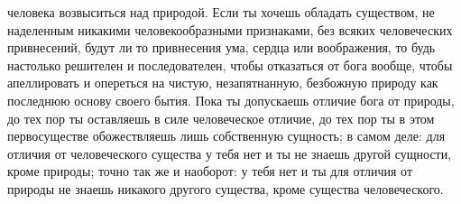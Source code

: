 \documentclass[12pt,oneside]{book}
\begin{document}
человека возвыситься над природой. Если ты хочешь обладать существом, не наделенным никакими человекообразными признаками, без всяких человеческих привнесений, будут ли то привнесения ума, сердца или воображения, то будь настолько решителен и последователен, чтобы отказаться от бога вообще, чтобы апеллировать и опереться на чистую, незапятнанную, безбожную природу как последнюю основу своего бытия. Пока ты допускаешь отличие бога от природы, до тех пор ты оставляешь в силе человеческое отличие, до тех пор ты в этом первосуществе обожествляешь лишь собственную сущность; в самом деле: для отличия от человеческого существа у тебя нет и ты не знаешь другой сущности, кроме природы; точно так же и наоборот: у тебя нет и ты для отличия от природы не знаешь никакого другого существа, кроме существа человеческого.

\chapter{}
\end{document}
